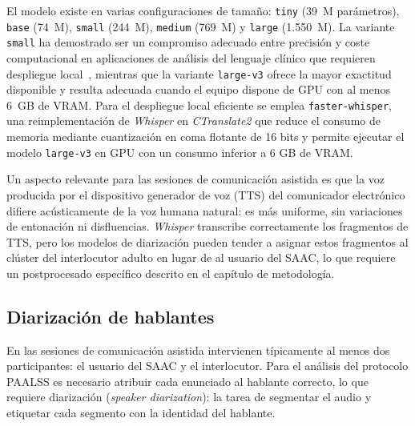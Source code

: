 El modelo existe en varias configuraciones de tamaño: \texttt{tiny} (39~M parámetros),
\texttt{base} (74~M), \texttt{small} (244~M), \texttt{medium} (769~M) y \texttt{large}
(1.550~M). La variante \texttt{small} ha demostrado ser un compromiso adecuado entre
precisión y coste computacional en aplicaciones de análisis del lenguaje clínico que
requieren despliegue local~\cite{lsa_swiss_benchmark,whisper_diarization_realtime},
mientras que la variante \texttt{large-v3} ofrece la mayor exactitud disponible y
resulta adecuada cuando el equipo dispone de \ac{GPU} con al menos 6~GB de VRAM. Para
el despliegue local eficiente se emplea \texttt{faster-whisper}, una reimplementación
de \emph{Whisper} en \emph{CTranslate2} que reduce el consumo de memoria mediante
cuantización en coma flotante de 16 bits y permite ejecutar el modelo \texttt{large-v3}
en \ac{GPU} con un consumo inferior a 6 GB de VRAM.

Un aspecto relevante para las sesiones de comunicación asistida es que la voz
producida por el dispositivo generador de voz (\ac{TTS}) del comunicador electrónico
difiere acústicamente de la voz humana natural: es más uniforme, sin variaciones de
entonación ni disfluencias. \emph{Whisper} transcribe correctamente los fragmentos de
\ac{TTS}, pero los modelos de diarización pueden tender a asignar estos fragmentos al clúster
del interlocutor adulto en lugar de al usuario del \ac{SAAC}, lo que requiere un
postprocesado específico descrito en el capítulo de metodología.


\subsection{Diarización de hablantes}
\label{subsec:diarizacion}

En las sesiones de comunicación asistida intervienen típicamente al menos dos
participantes: el usuario del \ac{SAAC} y el interlocutor. Para el análisis del protocolo
\ac{PAALSS} es necesario atribuir cada enunciado al hablante correcto, lo que requiere
diarización (\emph{speaker diarization}): la tarea de segmentar el audio y etiquetar cada
segmento con la identidad del hablante.

